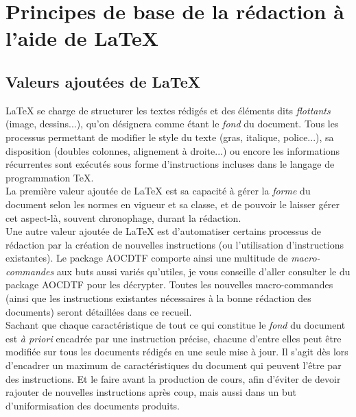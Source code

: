 \documentclass[a4paper, 11pt, twoside, fleqn]{memoir}
\begin{document}

	\chapter{Principes de base de la rédaction à l'aide de \LaTeX{}}
	\ChapFrame %

	\section{Valeurs ajoutées de \LaTeX{}}\label{sec:valeurs_ajoutees_latex}
		
	\LaTeX{} se charge de structurer les textes rédigés et des éléments dits \emph{flottants} (image, dessins...), qu'on désignera comme étant le \emph{fond} du document. Tous les processus permettant de modifier le style du texte (gras, italique, police...), sa disposition (doubles colonnes, alignement à droite...) ou encore les informations récurrentes sont exécutés sous forme d'instructions incluses dans le langage de programmation \TeX{}.\\
	
	La première valeur ajoutée de \LaTeX{} est sa capacité à gérer la \emph{forme} du document selon les normes en vigueur et sa classe, et de pouvoir le laisser gérer cet aspect-là, souvent chronophage, durant la rédaction.\\
	
	Une autre valeur ajoutée de \LaTeX{} est d'automatiser certains processus de rédaction par la création de nouvelles instructions (ou l'utilisation d'instructions existantes). Le package AOCDTF comporte ainsi une multitude de \emph{macro-commandes} aux buts aussi variés qu'utiles, je vous conseille d'aller consulter le  du package AOCDTF pour les décrypter. Toutes les nouvelles macro-commandes (ainsi que les instructions existantes nécessaires à la bonne rédaction des documents) seront détaillées dans ce recueil.\\
	Sachant que chaque caractéristique de tout ce qui constitue le \emph{fond} du document est \emph{à priori} encadrée par une instruction précise, chacune d'entre elles peut être modifiée sur tous les documents rédigés en une seule mise à jour. Il s'agit dès lors d'encadrer un maximum de caractéristiques du document qui peuvent l'être par des instructions. Et le faire avant la production de cours, afin d'éviter de devoir rajouter de nouvelles instructions après coup, mais aussi dans un but d'uniformisation des documents produits.\\
	
\end{document}
